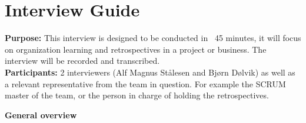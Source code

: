\chapter{Interview Guide}

\label{section:interview-guide}
\textbf{Purpose:} This interview is designed to be conducted in ~45 minutes, it will focus on organization learning and retrospectives in a project or business. The interview will be recorded and transcribed. \\
\textbf{Participants:} 2 interviewers (Alf Magnus Stålesen and Bjørn Dølvik) as well as a relevant representative from the team in question. For example the SCRUM master of the team, or the person in charge of holding the retrospectives. \\

\begin{center}
	\textbf{General overview}
\end{center}
